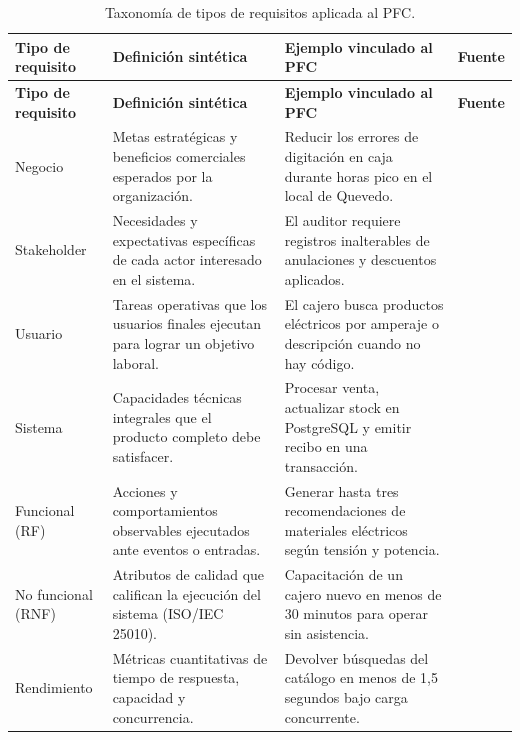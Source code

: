 \documentclass[onecolumn,12pt]{IEEEtran}
\begin{document}
	\begin{longtable}{>{\raggedright\arraybackslash}p{2.6cm} >{\raggedright\arraybackslash}p{5.2cm} >{\raggedright\arraybackslash}p{5.2cm} >{\raggedright\arraybackslash}p{2.0cm}}
		\caption{Taxonom\'ia de tipos de requisitos aplicada al PFC.}
		\label{tab:tipos_req}\\
		\toprule
		\textbf{Tipo de requisito} & \textbf{Definici\'on sint\'etica} & \textbf{Ejemplo vinculado al PFC} & \textbf{Fuente} \\
		\midrule
		\endfirsthead
		\toprule
		\textbf{Tipo de requisito} & \textbf{Definici\'on sint\'etica} & \textbf{Ejemplo vinculado al PFC} & \textbf{Fuente} \\
		\midrule
		\endhead
		\bottomrule
		\endfoot
		Negocio & Metas estrat\'egicas y beneficios comerciales esperados por la organizaci\'on. & Reducir los errores de digitaci\'on en caja durante horas pico en el local de Quevedo. & \cite{iso29148,wiegers2013} \\
		\midrule
		Stakeholder & Necesidades y expectativas espec\'ificas de cada actor interesado en el sistema. & El auditor requiere registros inalterables de anulaciones y descuentos aplicados. & \cite{iso29148,pmbok7} \\
		\midrule
		Usuario & Tareas operativas que los usuarios finales ejecutan para lograr un objetivo laboral. & El cajero busca productos el\'ectricos por amperaje o descripci\'on cuando no hay c\'odigo. & \cite{iso29148,ireb2023} \\
		\midrule
		Sistema & Capacidades t\'ecnicas integrales que el producto completo debe satisfacer. & Procesar venta, actualizar stock en PostgreSQL y emitir recibo en una transacci\'on. & \cite{iso29148,iso15288} \\
		\midrule
		Funcional (RF) & Acciones y comportamientos observables ejecutados ante eventos o entradas. & Generar hasta tres recomendaciones de materiales el\'ectricos seg\'un tensi\'on y potencia. & \cite{iso29148,pohl2025,mavin2009} \\
		\midrule
		No funcional (RNF) & Atributos de calidad que califican la ejecuci\'on del sistema (ISO/IEC 25010). & Capacitaci\'on de un cajero nuevo en menos de 30 minutos para operar sin asistencia. & \cite{iso25010,pohl2025,glinz2007} \\
		\midrule
		Rendimiento & M\'etricas cuantitativas de tiempo de respuesta, capacidad y concurrencia. & Devolver b\'usquedas del cat\'alogo en menos de 1,5 segundos bajo carga concurrente. & \cite{iso29148,iso25010} \\

\end{longtable}
\end{document}

